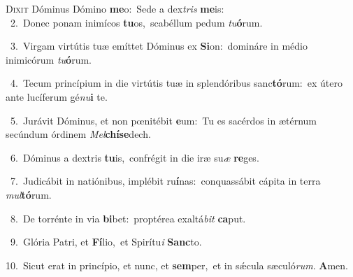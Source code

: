 \lettrine{\initial\textcolor{\initialcolor}{D}}{ixit} Dóminus Dómino \textbf{me}\-o:~\star Sede a dex\textit{tris} \textbf{me}\-is:\\
{\numbfont\textcolor{\numbcolor}{~2.}}~Donec ponam inimícos \textbf{tu}\-os,~\star scabéllum pedum \textit{tu}\-\textbf{ó}rum.\par
{\numbfont\textcolor{\numbcolor}{~3.}}~Virgam virtútis tuæ emíttet Dóminus ex \textbf{Si}\-on:~\star domináre in médio inimicórum \textit{tu}\-\textbf{ó}rum.\par
{\numbfont\textcolor{\numbcolor}{~4.}}~Tecum princípium in die virtútis tuæ in splendóribus sanc\-\textbf{tó}\-rum:~\star ex útero ante lucíferum gé\-\textit{nu}\-\textbf{i} te.\par
{\numbfont\textcolor{\numbcolor}{~5.}}~Jurávit Dóminus, et non pœnitébit \textbf{e}\-um:~\star Tu es sacérdos in ætérnum secúndum órdinem \textit{Mel}\-\textbf{chí}\textbf{se}dech.\par
{\numbfont\textcolor{\numbcolor}{~6.}}~Dóminus a dextris \textbf{tu}\-is,~\star confrégit in die iræ su\textit{æ} \textbf{re}\-ges.\par
{\numbfont\textcolor{\numbcolor}{~7.}}~Judicábit in natiónibus, implébit ru\-\textbf{í}\-nas:~\star conquassábit cápita in terra \textit{mul}\-\textbf{tó}rum.\par
{\numbfont\textcolor{\numbcolor}{~8.}}~De torrénte in via \textbf{bi}\-bet:~\star proptérea exaltá\textit{bit} \textbf{ca}\-put.\par
{\numbfont\textcolor{\numbcolor}{~9.}}~Glória Patri, et \textbf{Fí}\-lio,~\star et Spirítu\textit{i} \textbf{Sanc}\-to.\par
{\numbfont\textcolor{\numbcolor}{10.}}~Sicut erat in princípio, et nunc, et \textbf{sem}\-per,~\star et in sǽcula sæculó\-\textit{rum}\-. \textbf{A}\-men.\par
